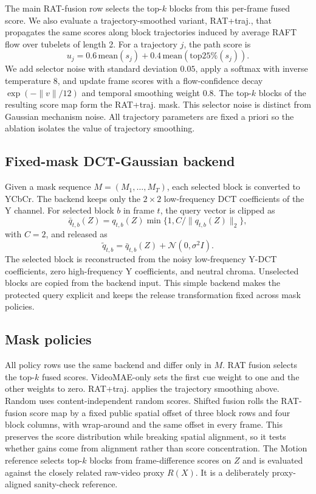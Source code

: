 The main RAT-fusion row selects the top-\(k\) blocks from this per-frame fused
score. We also evaluate a trajectory-smoothed variant, RAT+traj., that
propagates the same scores along block trajectories induced by average RAFT
flow over tubelets of length 2. For a trajectory \(j\), the path score is
\begin{equation}
u_j=0.6\,\mathrm{mean}(s_j)+0.4\,\mathrm{mean}(\mathrm{top25\%}(s_j)).
\end{equation}
We add selector noise with standard deviation \(0.05\), apply a softmax with
inverse temperature 8, and update frame scores with a flow-confidence decay
\(\exp(-\|v\|/12)\) and temporal smoothing weight 0.8. The top-\(k\) blocks
of the resulting score map form the RAT+traj. mask. This selector noise is
distinct from Gaussian mechanism noise. All trajectory parameters are fixed a
priori so the ablation isolates the value of trajectory smoothing.

\subsection{Fixed-mask DCT-Gaussian backend}

Given a mask sequence \(M=(M_1,\ldots,M_T)\), each selected block is converted
to YCbCr. The backend keeps only the \(2\times2\) low-frequency DCT
coefficients of the Y channel. For selected block \(b\) in frame \(t\), the
query vector is clipped as
\begin{equation}
\bar q_{t,b}(Z)=q_{t,b}(Z)\min\{1,C/\|q_{t,b}(Z)\|_2\},
\end{equation}
with \(C=2\), and released as
\begin{equation}
\tilde q_{t,b}=\bar q_{t,b}(Z)+\mathcal{N}(0,\sigma^2I).
\end{equation}
The selected block is reconstructed from the noisy low-frequency Y-DCT
coefficients, zero high-frequency Y coefficients, and neutral chroma. Unselected
blocks are copied from the backend input. This simple backend makes the
protected query explicit and keeps the release transformation fixed across mask
policies.

\subsection{Mask policies}

All policy rows use the same backend and differ only in \(M\). RAT fusion
selects the top-\(k\) fused scores. VideoMAE-only sets the first cue weight to
one and the other weights to zero. RAT+traj. applies the trajectory smoothing
above. Random uses content-independent random scores. Shifted fusion
rolls the RAT-fusion score map by a fixed public spatial offset of three block
rows and four block columns, with wrap-around and the same offset in every
frame. This preserves the score distribution while breaking spatial alignment,
so it tests whether gains come from alignment rather than score concentration.
The Motion reference selects top-\(k\) blocks from frame-difference scores on
\(Z\) and is evaluated against the closely related raw-video proxy \(R(X)\). It
is a deliberately proxy-aligned sanity-check reference.

